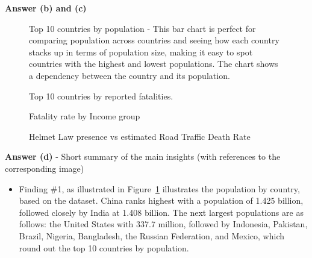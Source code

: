 \documentclass[a4paper,10pt]{article}\setlength{\textheight}{10in}\setlength{\textwidth}{6.5in}\setlength{\topmargin}{-0.125in}\setlength{\oddsidemargin}{-.2in}\setlength{\evensidemargin}{-.2in}\setlength{\headsep}{0.2in}\setlength{\footskip}{0pt}\usepackage{amsmath}\usepackage{fancyhdr}\usepackage{enumitem}\usepackage{hyperref}\usepackage{xcolor}\usepackage{graphicx}\usepackage[export]{adjustbox}\usepackage{caption}\usepackage{float}\usepackage{booktabs}\usepackage{makecell}\pagestyle{fancy}
\begin{document}
\begin{enumerate}[topsep=0mm, partopsep=0mm, leftmargin=*]
    
\textbf{Answer (b) and (c)}
    \begin{figure}[H]
        \centering
        \caption{Top 10 countries by population - This bar chart is perfect for comparing population across countries and seeing how each country stacks up in terms of population size, making it easy to spot countries with the highest and lowest populations. The chart shows a dependency between the country and its population. }
        \label{fig:plot1}
    \end{figure}
    \begin{figure}[H]
        \centering
        \caption{Top 10 countries by reported fatalities.}
        \label{fig:plot2}
    \end{figure}
    \begin{figure}[H]
        \centering
        \caption{Fatality rate by Income group}
        \label{fig:plot3}
    \end{figure}
    \begin{figure}[H]
        \centering
        \caption{Helmet Law presence vs estimated Road Traffic Death Rate}
        \label{fig:plot4}
    \end{figure}

\textbf{Answer (d)} - Short summary of the main insights (with references to the corresponding image)
    \begin{itemize}
        \item Finding \#1, as illustrated in Figure~\ref{fig:plot1}  illustrates the population by country, based on the dataset. China ranks highest with a population of 1.425 billion, followed closely by India at 1.408 billion. The next largest populations are as follows: the United States with 337.7 million, followed by Indonesia, Pakistan, Brazil, Nigeria, Bangladesh, the Russian Federation, and Mexico, which round out the top 10 countries by population.


\end{itemize}
\end{enumerate}
\end{document}
